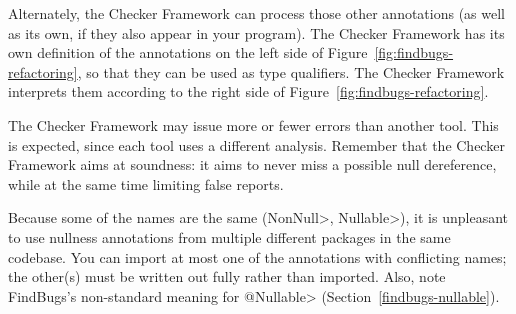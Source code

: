 

Alternately, the Checker Framework can process those other annotations (as
well as its own, if they also appear in your program).  The Checker
Framework has its own definition of the annotations on the left side of
Figure~\ref{fig:findbugs-refactoring}, so that they can be used as type
qualifiers.  The Checker Framework interprets them according to the right
side of Figure~\ref{fig:findbugs-refactoring}.

The Checker Framework may issue more or fewer errors than another tool.
This is expected, since each tool uses a different analysis.  Remember that
the Checker Framework aims at soundness:  it aims to never miss a possible
null dereference, while at the same time limiting false reports.

Because some of the names are the same (\<NonNull>, \<Nullable>), it is
unpleasant to use nullness annotations from multiple different packages in
the same codebase.  You can import at most one of the annotations with
conflicting names; the other(s) must be written out fully rather than
imported.  Also, note FindBugs's non-standard meaning for
\<@Nullable> (Section~\ref{findbugs-nullable}).



